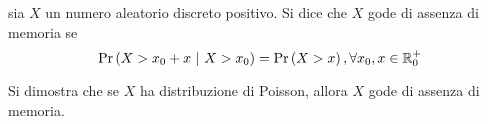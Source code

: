 \documentclass{subfiles}
\begin{document}
\begin{Definition*}
    sia \(X\) un numero aleatorio discreto positivo. Si dice che \(X\) gode di assenza di memoria se
    \[
        \Prob{X > x_{0} + x}[X > x_{0}] = \Prob{X > x}, \forall x_{0}, x \in \Real_{0}^{+}
    \]
\end{Definition*}
\begin{Remark*}
    Si dimostra che se \(X\) ha distribuzione di Poisson, allora \(X\) gode di assenza di memoria.
\end{Remark*}
\end{document}
